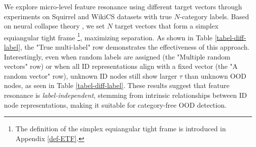 



We explore micro-level feature resonance using different target vectors through experiments on Squirrel and WikiCS datasets with true \( N \)-category labels. Based on neural collapse theory \citep{papyan2020prevalence,zhou2022all}, we set \( N \) target vectors that form a simplex equiangular tight frame \footnote{The definition of the simplex equiangular tight frame is introduced in Appendix \ref{def-ETF}.}, maximizing separation. As shown in Table \ref{tabel-diff-label}, the "True multi-label" row demonstrates the effectiveness of this approach. Interestingly, even when random labels are assigned (the "Multiple random vectors" row) or when all ID representations align with a fixed vector (the "A random vector" row), unknown ID nodes still show larger $\tau$ than unknown OOD nodes, as seen in Table \ref{tabel-diff-label}. These results suggest that feature resonance is \textit{label-independent}, stemming from intrinsic relationships between ID node representations, making it suitable for category-free OOD detection.


